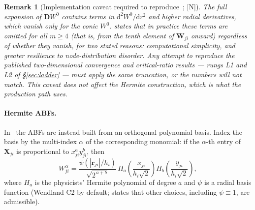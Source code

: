 \documentclass[11pt,a4paper]{article}
\newcommand{\rji}{\bm{r}_{ji}}
\newcommand{\New}{\textcolor{blue!60!black}{\textsf{[N]}}}
\newtheorem{remark}{Remark}
\begin{document}
\begin{remark}[Implementation caveat required to reproduce~\cite{KLN2020}; \New]
\label{rem:truncation}
The full expansion \cite[Eq.~(A.2)]{KLN2020} of $\bm D W^{0}$ contains terms in
$\mathrm d^2W^{0}/\mathrm dr^2$ and higher radial derivatives, which vanish only for the
conic $W^{0}$. \cite[Appendix A]{KLN2020} states that in practice these terms are
\emph{omitted} for all $m\ge4$ (that is, from the tenth element of $\bm W_{ji}$ onward)
\emph{regardless of whether they vanish}, for two stated reasons: computational
simplicity, and greater resilience to node-distribution disorder. Any attempt to
reproduce the published two-dimensional convergence and critical-ratio results ---
rungs L1 and L2 of \S\ref{sec:ladder} --- must apply the same truncation, or the
numbers will not match. This caveat does not affect the Hermite construction, which is
what the production path uses.
\end{remark}

\paragraph{Hermite ABFs.} In~\cite{KL2021} the ABFs are instead built from an
orthogonal polynomial basis. Index the basis by the multi-index
$\alpha$ of the corresponding monomial: if the $\alpha$-th entry of $\bm X_{ji}$ is
proportional to $x_{ji}^{a}y_{ji}^{b}$, then \cite[Eqs.~(10),(11)]{KL2021}
\begin{equation}
W^{\alpha}_{ji}=\frac{\psi\!\left(|\rji|/h_i\right)}{\sqrt{2^{\,a+b}}}\,
H_a\!\left(\frac{x_{ji}}{h_i\sqrt2}\right)
H_b\!\left(\frac{y_{ji}}{h_i\sqrt2}\right),
\label{eq:hermiteABF}
\end{equation}
where $H_a$ is the physicists' Hermite polynomial of degree $a$ and $\psi$ is a radial
basis function (Wendland C2 by default; \cite{KL2021} states that other choices,
including $\psi\equiv1$, are admissible).
\end{document}
